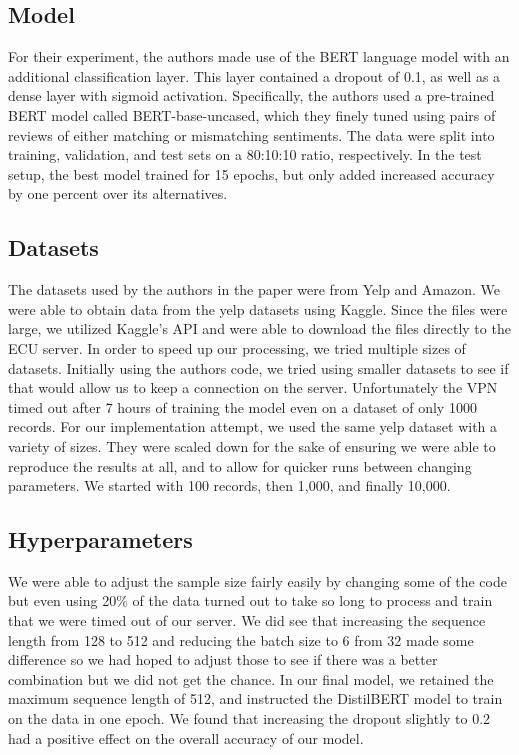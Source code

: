 \documentclass[conference]{IEEEtran}
\begin{document}
\subsection{Model}
	For their experiment, the authors made use of the BERT language model with an additional classification layer. This layer contained a dropout of 0.1, as well as a dense layer with sigmoid activation. Specifically, the authors used a pre-trained BERT model called BERT-base-uncased, which they finely tuned using pairs of reviews of either matching or mismatching sentiments.
	The data were split into training, validation, and test sets on a 80:10:10 ratio, respectively. In the test setup, the best model trained for 15 epochs, but only added increased accuracy by one percent over its alternatives.

\subsection{Datasets}  
	The datasets used by the authors in the paper were from Yelp and Amazon.  We were able to obtain data from the yelp datasets using Kaggle.  Since the files were large, we utilized Kaggle’s API and were able to download the files directly to the ECU server. In order to speed up our processing, we tried multiple sizes of datasets.
	Initially using the authors code, we tried using smaller datasets to see if that would allow us to keep a connection on the server. Unfortunately the VPN timed out after 7 hours of training the model even on a dataset of only 1000 records.
	For our implementation attempt, we used the same yelp dataset with a variety of sizes. They were scaled down for the sake of ensuring we were able to reproduce the results at all, and to allow for quicker runs between changing parameters. We started with 100 records, then 1,000, and finally 10,000.

\subsection{Hyperparameters}  
	We were able to adjust the sample size fairly easily by changing some of the code but even using 20\% of the data turned out to take so long to process and train that we were timed out of our server.  We did see that increasing the sequence length from 128 to 512 and reducing the batch size to 6 from 32 made some difference so we had hoped to adjust those to see if there was a better combination but we did not get the chance.
	In our final model, we retained the maximum sequence length of 512, and instructed the DistilBERT model to train on the data in one epoch. We found that increasing the dropout slightly to 0.2 had a positive effect on the overall accuracy of our model.
\end{document}
